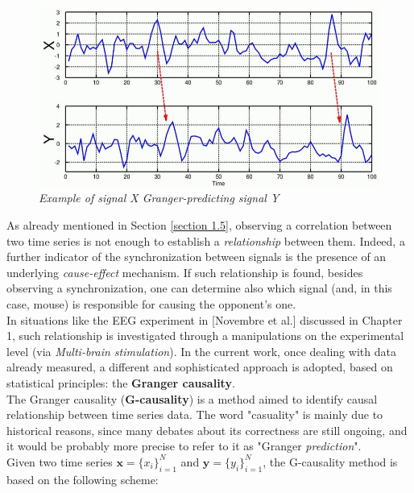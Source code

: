 \documentclass[12pt, a4paper]{article}
\begin{document}
\begin{figure}[H]
	\begin{center}
		\hspace*{-1cm}
		\includegraphics[scale=.55]{GC.png} 
	\end{center} 
	\caption{\textit{Example of signal X Granger-predicting signal Y }} 
	
\end{figure}

As already mentioned in Section \ref{section 1.5}, observing a correlation between two time series 
is not enough to establish a \textit{relationship} between them. Indeed, a further indicator of  the synchronization between signals is the presence of an underlying \textit{cause-effect} mechanism. If such relationship is found, besides observing a synchronization, one can determine also which signal (and, in this case, mouse) is responsible for causing the opponent's one.\\
In situations like the EEG experiment in [Novembre et al.] discussed in Chapter 1, such relationship is investigated through a manipulations on the experimental level (via \textit{Multi-brain stimulation}). In  the current work, once dealing with data already measured, a different and sophisticated approach is adopted, based on statistical principles: the \textbf{Granger causality}.\\
The Granger causality (\textbf{G-causality}) is a method aimed to identify causal relationship between time series data. The word "casuality" is mainly due to historical reasons, since many debates about its correctness are still ongoing, and it would be probably more precise to refer to it as "Granger \textit{prediction}".
\\

Given two time series $ \textbf{x} = \{x_i\}_{i=1}^N$ and  $\textbf{y} = \{y_i\}_{i=1}^N$, the G-causality method is based on the following scheme:
\end{document}
